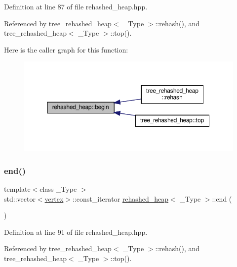 Definition at line 87 of file rehashed\+\_\+heap.\+hpp.



Referenced by tree\+\_\+rehashed\+\_\+heap$<$ \+\_\+\+Type $>$\+::rehash(), and tree\+\_\+rehashed\+\_\+heap$<$ \+\_\+\+Type $>$\+::top().

Here is the caller graph for this function\+:
\nopagebreak
\begin{figure}[H]
\begin{center}
\leavevmode
\includegraphics[width=350pt]{d8/d55/structrehashed__heap_ae0343798d9399ca2fb9623de6b9315d5_icgraph}
\end{center}
\end{figure}
\mbox{\label{structrehashed__heap_a2f8bb7618d597af59dfcce52cd7223d4}} 
\subsubsection{\texorpdfstring{end()}{end()}}
{\footnotesize\ttfamily template$<$class \+\_\+\+Type $>$ \\
std\+::vector$<$\hyperlink{graph_8hpp_abefdcf0544e601805af44eca032cca14}{vertex}$>$\+::const\+\_\+iterator \hyperlink{structrehashed__heap}{rehashed\+\_\+heap}$<$ \+\_\+\+Type $>$\+::end (\begin{DoxyParamCaption}{ }\end{DoxyParamCaption})\hspace{0.3cm}{\ttfamily [inline]}}



Definition at line 91 of file rehashed\+\_\+heap.\+hpp.



Referenced by tree\+\_\+rehashed\+\_\+heap$<$ \+\_\+\+Type $>$\+::rehash(), and tree\+\_\+rehashed\+\_\+heap$<$ \+\_\+\+Type $>$\+::top().

